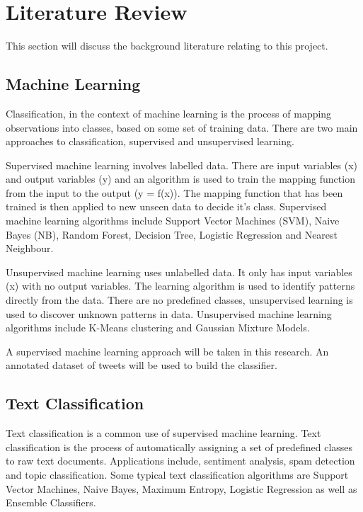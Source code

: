 \chapter{Literature Review}

This section will discuss the background literature relating to this project.

\section{Machine Learning}

Classification, in the context of machine learning is the process of mapping observations into classes, based on some set of training data. There are two main approaches to classification, supervised and unsupervised learning. 

Supervised machine learning involves labelled data. There are input variables (x) and output variables (y) and an algorithm is used to train the mapping function from the input to the output (y = f(x)). The mapping function that has been trained is then applied to new unseen data to decide it's class. Supervised machine learning algorithms include Support Vector Machines (SVM), Naive Bayes (NB), Random Forest, Decision Tree, Logistic Regression and Nearest Neighbour.

Unsupervised machine learning uses unlabelled data. It only has input variables (x) with no output variables. The learning algorithm is used to identify patterns directly from the data. There are no predefined classes, unsupervised learning is used to discover unknown patterns in data. Unsupervised machine learning algorithms include K-Means clustering and Gaussian Mixture Models. 

A supervised machine learning approach will be taken in this research. An annotated dataset of tweets will be used to build the classifier.

\section{Text Classification}

Text classification is a common use of supervised machine learning. Text classification is the process of automatically assigning a set of predefined classes to raw text documents. Applications include, sentiment analysis, spam detection and topic classification. Some typical text classification algorithms are Support Vector Machines, Naive Bayes, Maximum Entropy, Logistic Regression as well as Ensemble Classifiers.

